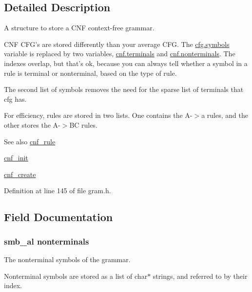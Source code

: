 \subsection{\-Detailed \-Description}
\-A structure to store a \-C\-N\-F context-\/free grammar. 

\-C\-N\-F \-C\-F\-G's are stored differently than your average \-C\-F\-G. \-The \hyperlink{structcfg_af90e802d07cdf4a88bde8043b57ec666}{cfg.\-symbols} variable is replaced by two variables, \hyperlink{structcnf_ae85a135e82c4af0e75739a21b3ec03b4}{cnf.\-terminals} and \hyperlink{structcnf_a48ad19ba58732910c48d1e821a3ea428}{cnf.\-nonterminals}. \-The indexes overlap, but that's ok, because you can always tell whether a symbol in a rule is terminal or nonterminal, based on the type of rule.

\-The second list of symbols removes the need for the sparse list of terminals that cfg has.

\-For efficiency, rules are stored in two lists. \-One contains the \-A-\/$>$a rules, and the other stores the \-A-\/$>$\-B\-C rules.

\begin{DoxySeeAlso}{\-See also}
\hyperlink{structcnf__rule}{cnf\-\_\-rule} 

\hyperlink{gram_8h_a6498d2481623fd5851966f63bb2d8008}{cnf\-\_\-init} 

\hyperlink{gram_8h_a3a4d3ef76c22529d33625b34667dce89}{cnf\-\_\-create} 
\end{DoxySeeAlso}


\-Definition at line 145 of file gram.\-h.



\subsection{\-Field \-Documentation}
\hypertarget{structcnf_a48ad19ba58732910c48d1e821a3ea428}{
\subsubsection[{nonterminals}]{\setlength{\rightskip}{0pt plus 5cm}smb\-\_\-al {\bf nonterminals}}}\label{structcnf_a48ad19ba58732910c48d1e821a3ea428}


\-The nonterminal symbols of the grammar. 

\-Nonterminal symbols are stored as a list of char$\ast$ strings, and referred to by their index. 

